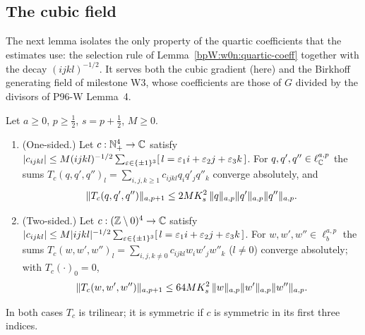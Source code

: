 \subsection{The cubic field}\label{bpW:w1:cubic}

The next lemma isolates the only property of the quartic coefficients that the estimates use: the selection rule of
Lemma~\ref{bpW:w0n:quartic-coeff} together with the decay $(ijkl)^{-1/2}$. It serves both the cubic gradient (here) and
the Birkhoff generating field of milestone W3, whose coefficients are those of $G$ divided by the divisors of P96-W
Lemma~4.

\begin{lemma}\label{bpW:w1:selection}
Let $a\ge0$, $p\ge\frac12$, $s=p+\frac12$, $M\ge0$.
\begin{enumerate}[label=(\alph*)]
\item (One-sided.) Let $c:\mathbb{N}_+^4\to\mathbb{C}$ satisfy
  $\lvert c_{ijkl}\rvert\le M(ijkl)^{-1/2}\sum_{\varepsilon\in\{\pm1\}^3}[\,l=\varepsilon_1i+\varepsilon_2j+\varepsilon_3k\,]$.
  For $q,q',q''\in\ell^{a,p}_{\mathbb{C}}$ the sums $T_c(q,q',q'')_l=\sum_{i,j,k\ge1}c_{ijkl}q_iq'_jq''_k$ converge absolutely, and
  \[\lVert T_c(q,q',q'')\rVert_{a,p+1}\le2MK_s^2\,\lVert q\rVert_{a,p}\lVert q'\rVert_{a,p}\lVert q''\rVert_{a,p}.\]
\item (Two-sided.) Let $c:(\mathbb{Z}\setminus0)^4\to\mathbb{C}$ satisfy
  $\lvert c_{ijkl}\rvert\le M\lvert ijkl\rvert^{-1/2}\sum_{\varepsilon\in\{\pm1\}^3}[\,l=\varepsilon_1i+\varepsilon_2j+\varepsilon_3k\,]$.
  For $w,w',w''\in\ell^{a,p}_b$ the sums $T_c(w,w',w'')_l=\sum_{i,j,k\ne0}c_{ijkl}w_iw'_jw''_k$ ($l\ne0$) converge
  absolutely; with $T_c(\cdot)_0=0$,
  \[\lVert T_c(w,w',w'')\rVert_{a,p+1}\le64MK_s^2\,\lVert w\rVert_{a,p}\lVert w'\rVert_{a,p}\lVert w''\rVert_{a,p}.\]
\end{enumerate}
In both cases $T_c$ is trilinear; it is symmetric if $c$ is symmetric in its first three indices.
\end{lemma}

